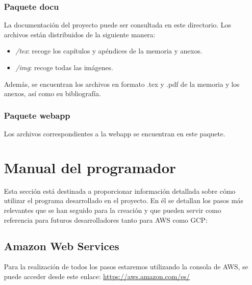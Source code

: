 \subsubsection{Paquete docu}

 La documentación del proyecto puede ser consultada en este directorio. Los archivos están distribuidos de la siguiente manera:

\begin{itemize}
\tightlist
\item
\emph{/tex}: recoge los capítulos y apéndices de la memoria y anexos.
\item
\emph{/img}: recoge todas las imágenes.
\end{itemize}

Además, se encuentran los archivos en formato .tex y .pdf de la memoria y los anexos, así como su bibliografía.


\subsubsection{Paquete webapp}

Los archivos correspondientes a la webapp se encuentran en este paquete. 



\section{Manual del programador}

Esta sección está destinada a proporcionar información detallada sobre cómo utilizar el programa desarrollado en el proyecto. En él se detallan los pasos más relevantes que se han seguido para la creación y que pueden servir como referencia para futuros desarrolladores tanto para AWS como GCP:

\subsection{Amazon Web Services}
Para la realización de todos los pasos estaremos utilizando la consola de AWS, se puede acceder desde este enlace: \url{https://aws.amazon.com/es/}

